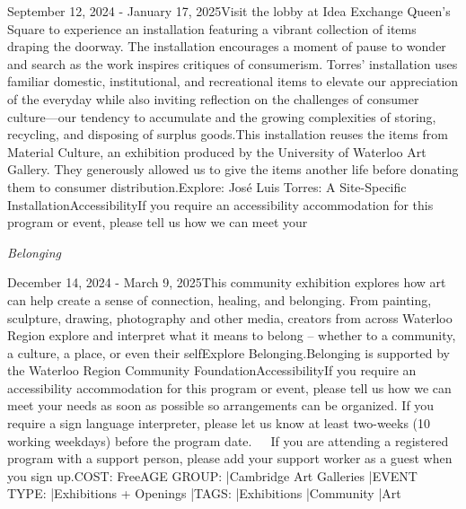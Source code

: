 \documentclass[letterpaper, 10pt]{article}
\newcommand{\subtitle}[1]{\textit{\large #1}\vspace{0.5em}}
\newcommand{\articlecontent}[1]{\small #1\vspace{1em}}
\begin{document}
\begin{multicols}{2}
{
\vspace{10px}

September 12, 2024 - January 17, 2025Visit the lobby at Idea Exchange Queen's Square to experience an installation featuring a vibrant collection of items draping the doorway. The installation encourages a moment of pause to wonder and search as the work inspires critiques of consumerism. Torres’ installation uses familiar domestic, institutional, and recreational items to elevate our appreciation of the everyday while also inviting reflection on the challenges of consumer culture—our tendency to accumulate and the growing complexities of storing, recycling, and disposing of surplus goods.This installation reuses the items from Material Culture, an exhibition produced by the University of Waterloo Art Gallery. They generously allowed us to give the items another life before donating them to consumer distribution.Explore: José Luis Torres: A Site-Specific InstallationAccessibilityIf you require an accessibility accommodation for this program or event, please tell us how we can meet your
}
\vspace{10px}

\subtitle{Belonging}

\articlecontent{

\qrcode[height=1.5cm]{https://ideaexchange.libnet.info/event/12094533}
\vspace{10px}

December 14, 2024 - March 9, 2025This community exhibition explores how art can help create a sense of connection, healing, and belonging. From painting, sculpture, drawing, photography and other media, creators from across Waterloo Region explore and interpret what it means to belong – whether to a community, a culture, a place, or even their selfExplore Belonging.Belonging is supported by the Waterloo Region Community FoundationAccessibilityIf you require an accessibility accommodation for this program or event, please tell us how we can meet your needs as soon as possible so arrangements can be organized. If you require a sign language interpreter, please let us know at least two-weeks (10 working weekdays) before the program date.   If you are attending a registered program with a support person, please add your support worker as a guest when you sign up.COST: FreeAGE GROUP: |Cambridge Art Galleries |EVENT TYPE: |Exhibitions + Openings |TAGS: |Exhibitions |Community |Art
}
\vspace{10px}


\end{multicols}
\end{document}
